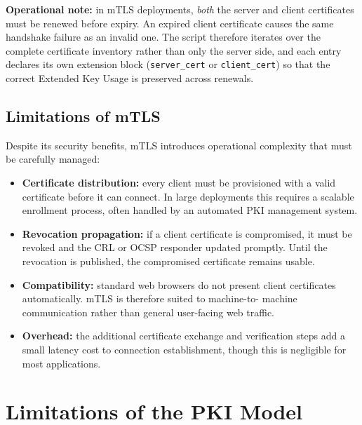\documentclass[10pt,twocolumn]{article}
\begin{document}
\begin{alertbox}
\footnotesize\textbf{Operational note:} in mTLS deployments, \emph{both}
the server and client certificates must be renewed before expiry. An
expired client certificate causes the same handshake failure as an invalid
one. The script therefore iterates over the complete certificate inventory
rather than only the server side, and each entry declares its own
extension block (\texttt{server\_cert} or \texttt{client\_cert}) so that
the correct Extended Key Usage is preserved across renewals.
\end{alertbox}

\subsection{Limitations of mTLS}

Despite its security benefits, mTLS introduces operational complexity that
must be carefully managed:

\begin{itemize}
  \item \textbf{Certificate distribution:} every client must be provisioned
        with a valid certificate before it can connect. In large deployments
        this requires a scalable enrollment process, often handled by an
        automated PKI management system.
  \item \textbf{Revocation propagation:} if a client certificate is
        compromised, it must be revoked and the CRL or OCSP responder
        updated promptly. Until the revocation is published, the compromised
        certificate remains usable.
  \item \textbf{Compatibility:} standard web browsers do not present client
        certificates automatically. mTLS is therefore suited to machine-to-
        machine communication rather than general user-facing web traffic.
  \item \textbf{Overhead:} the additional certificate exchange and verification
        steps add a small latency cost to connection establishment, though
        this is negligible for most applications.
\end{itemize}

\section{Limitations of the PKI Model}
\end{document}
